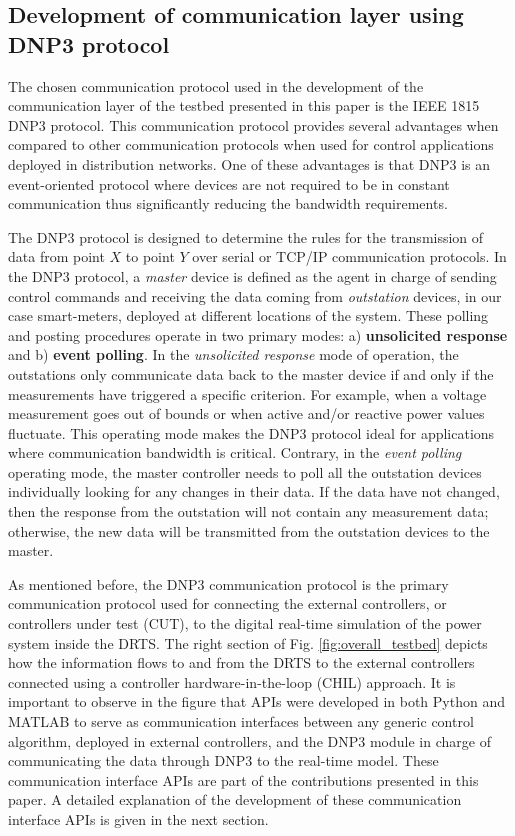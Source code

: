 \subsection{Development of communication layer using DNP3 protocol}
The chosen communication protocol used in the development of the communication layer of the testbed presented in this paper is the IEEE 1815 DNP3 protocol. This communication protocol provides several advantages when compared to other communication protocols when used for control applications deployed in distribution networks. One of these advantages is that DNP3 is an event-oriented protocol where devices are not required to be in constant communication thus significantly reducing the bandwidth requirements.

The DNP3 protocol is designed to determine the rules for the transmission of data from point $X$ to point $Y$ over serial or TCP/IP communication protocols. In the DNP3 protocol, a \textit{master} device is defined as the agent in charge of sending control commands and receiving the data coming from \textit{outstation} devices, in our case smart-meters, deployed at different locations of the system. These polling and posting procedures operate in two primary modes: a) \textbf{unsolicited response} and b) \textbf{event polling}. In the \textit{unsolicited response} mode of operation, the outstations only communicate data back to the master device if and only if the measurements have triggered a specific criterion. For example, when a voltage measurement goes out of bounds or when active and/or reactive power values fluctuate. This operating mode makes the DNP3 protocol ideal for applications where communication bandwidth is critical. Contrary, in the \textit{event polling} operating mode, the master controller needs to poll all the outstation devices individually looking for any changes in their data. If the data have not changed, then the response from the outstation will not contain any measurement data; otherwise, the new data will be transmitted from the outstation devices to the master.

As mentioned before, the DNP3 communication protocol is the primary communication protocol used for connecting the external controllers, or controllers under test (CUT), to the digital real-time simulation of the power system inside the DRTS. The right section of Fig. \ref{fig:overall_testbed} depicts how the information flows to and from the DRTS to the external controllers connected using a controller hardware-in-the-loop (CHIL) approach. It is important to observe in the figure that APIs were developed in both Python and MATLAB to serve as communication interfaces between any generic control algorithm, deployed in external controllers, and the DNP3 module in charge of communicating the data through DNP3 to the real-time model. These communication interface APIs are part of the contributions presented in this paper. A detailed explanation of the development of these communication interface APIs is given in the next section.